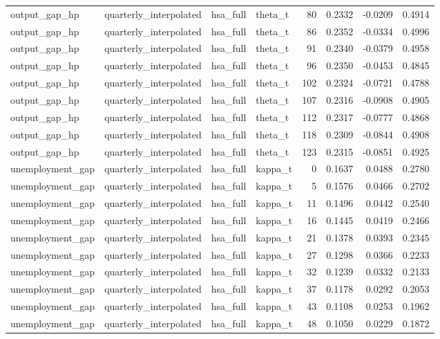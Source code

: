 \begin{tabular}{llllrrrr}
output\_gap\_hp & quarterly\_interpolated & hsa\_full & theta\_t & 80 & 0.2332 & -0.0209 & 0.4914 \\
output\_gap\_hp & quarterly\_interpolated & hsa\_full & theta\_t & 86 & 0.2352 & -0.0334 & 0.4996 \\
output\_gap\_hp & quarterly\_interpolated & hsa\_full & theta\_t & 91 & 0.2340 & -0.0379 & 0.4958 \\
output\_gap\_hp & quarterly\_interpolated & hsa\_full & theta\_t & 96 & 0.2350 & -0.0453 & 0.4845 \\
output\_gap\_hp & quarterly\_interpolated & hsa\_full & theta\_t & 102 & 0.2324 & -0.0721 & 0.4788 \\
output\_gap\_hp & quarterly\_interpolated & hsa\_full & theta\_t & 107 & 0.2316 & -0.0908 & 0.4905 \\
output\_gap\_hp & quarterly\_interpolated & hsa\_full & theta\_t & 112 & 0.2317 & -0.0777 & 0.4868 \\
output\_gap\_hp & quarterly\_interpolated & hsa\_full & theta\_t & 118 & 0.2309 & -0.0844 & 0.4908 \\
output\_gap\_hp & quarterly\_interpolated & hsa\_full & theta\_t & 123 & 0.2315 & -0.0851 & 0.4925 \\
unemployment\_gap & quarterly\_interpolated & hsa\_full & kappa\_t & 0 & 0.1637 & 0.0488 & 0.2780 \\
unemployment\_gap & quarterly\_interpolated & hsa\_full & kappa\_t & 5 & 0.1576 & 0.0466 & 0.2702 \\
unemployment\_gap & quarterly\_interpolated & hsa\_full & kappa\_t & 11 & 0.1496 & 0.0442 & 0.2540 \\
unemployment\_gap & quarterly\_interpolated & hsa\_full & kappa\_t & 16 & 0.1445 & 0.0419 & 0.2466 \\
unemployment\_gap & quarterly\_interpolated & hsa\_full & kappa\_t & 21 & 0.1378 & 0.0393 & 0.2345 \\
unemployment\_gap & quarterly\_interpolated & hsa\_full & kappa\_t & 27 & 0.1298 & 0.0366 & 0.2233 \\
unemployment\_gap & quarterly\_interpolated & hsa\_full & kappa\_t & 32 & 0.1239 & 0.0332 & 0.2133 \\
unemployment\_gap & quarterly\_interpolated & hsa\_full & kappa\_t & 37 & 0.1178 & 0.0292 & 0.2053 \\
unemployment\_gap & quarterly\_interpolated & hsa\_full & kappa\_t & 43 & 0.1108 & 0.0253 & 0.1962 \\
unemployment\_gap & quarterly\_interpolated & hsa\_full & kappa\_t & 48 & 0.1050 & 0.0229 & 0.1872 \\

\end{tabular}
